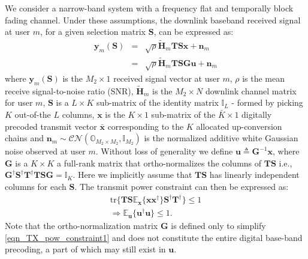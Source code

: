 \documentclass[journal,comsoc]{IEEEtran}
\begin{document}
%
%
We consider a narrow-band system with a frequency flat and temporally block fading channel. Under these assumptions, the downlink baseband  received signal at user $m$, for a given selection matrix $\mathbf{S}$, can be expressed as: 
\begin{subequations}
\begin{eqnarray}
\mathbf{y}_m(\mathbf{S}) &=& \sqrt{\rho} \widetilde{\mathbf{H}}_m \mathbf{T} \mathbf{S} \mathbf{x} + \mathbf{n}_m \label{eqn_downlink_y1} \\
&=& \sqrt{\rho} \widetilde{\mathbf{H}}_m \mathbf{T} \mathbf{S} \mathbf{G u} + \mathbf{n}_m \label{eqn_downlink_y2}
\end{eqnarray}
\end{subequations}
where $\mathbf{y}_m(\mathbf{S})$ is the $M_2 \times 1$ received signal vector at user $m$, $\rho$ is the mean receive signal-to-noise ratio (SNR), $\widetilde{\mathbf{H}}_m$ is the $M_2 \times N$ downlink channel matrix for user $m$, $\mathbf{S}$ is a $L \times K$ sub-matrix of the identity matrix $\mathbb{I}_{L}$ - formed by picking $K$ out-of-the $L$ columns, $\mathbf{x}$ is the $K \times 1$ sub-matrix of the $\bar{K} \times 1$ digitally precoded transmit vector $\bar{\mathbf{x}}$ corresponding to the $K$ allocated up-conversion chains and $\mathbf{n}_m \sim \mathcal{CN}(\mathbb{O}_{M_2\times M_2},\mathbb{I}_{M_2})$ is the normalized additive white Gaussian noise observed at user $m$. Without loss of generality we define $\mathbf{u} \triangleq \mathbf{G}^{-1} \mathbf{x}$, where $\mathbf{G}$ is a $K\times K$ a full-rank matrix that ortho-normalizes the columns of $\mathbf{T}\mathbf{S}$ i.e., $\mathbf{G}^{\dag} \mathbf{S}^{\dag} \mathbf{T}^{\dag} \mathbf{T}\mathbf{S} \mathbf{G} = \mathbb{I}_K$. Here we implicitly assume that $\mathbf{T} \mathbf{S}$ has linearly independent columns for each $\mathbf{S}$. 
%
The transmit power constraint can then be expressed as:
\begin{subequations}
\begin{eqnarray} 
\text{tr}\{\mathbf{T S} \mathbb{E}_{\mathbf{x}}\{\mathbf{x} \mathbf{x}^{\dag}\} \mathbf{S}^{\dag} \mathbf{T}^{\dag} \} \leq 1 \label{eqn_TX_pow_constraint1} \\
\Rightarrow \mathbb{E}_{\mathbf{u}}\{\mathbf{u}^{\dag} \mathbf{u} \} \leq 1. \label{eqn_TX_pow_constraint}
\end{eqnarray}
\end{subequations}
Note that the ortho-normalization matrix $\mathbf{G}$ is defined only to simplify \eqref{eqn_TX_pow_constraint1} and does not constitute the entire digital base-band precoding, a part of which may still exist in $\mathbf{u}$. 
\end{document}
